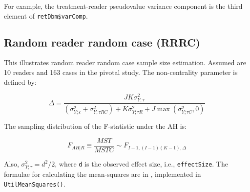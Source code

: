 \documentclass[
]{book}
\newenvironment{Shaded}{\begin{snugshade}}{\end{snugshade}}
\newcommand{\CommentTok}[1]{\textcolor[rgb]{0.56,0.35,0.01}{\textit{#1}}}
\newcommand{\NormalTok}[1]{#1}
\newcommand{\OperatorTok}[1]{\textcolor[rgb]{0.81,0.36,0.00}{\textbf{#1}}}
\begin{document}
\begin{Shaded}
\end{Shaded}

For example, the treatment-reader pseudovalue variance component is the third element of \texttt{retDbm\$varComp}.

\hypertarget{random-reader-random-case-rrrc}{%
\subsection{Random reader random case (RRRC)}\label{random-reader-random-case-rrrc}}

This illustrates random reader random case sample size estimation. Assumed are 10 readers and 163 cases in the pivotal study. The non-centrality parameter is defined by:

\begin{equation*} 
\Delta =\frac{JK\sigma _{Y;\tau }^{2}}{\left( \sigma _{Y;\varepsilon }^{2}+\sigma _{Y;\tau RC}^{2} \right)+K\sigma _{Y;\tau R}^{2}+J\max \left( \sigma _{Y;\tau C}^{2},0 \right)}
\end{equation*}

The sampling distribution of the F-statistic under the AH is:

\begin{equation*} 
{F_{\left. AH \right|R}}\equiv \frac{MST}{MSTC}\sim{F_{I-1,\left( I-1 \right)\left(K-1 \right),\Delta}}
\end{equation*}

Also, \(\sigma _{Y;\tau }^{2}={{d}^{2}}/2\), where \texttt{d} is the observed effect size, i.e., \texttt{effectSize}. The formulae for calculating the mean-squares are in \citep{RN1476}, implemented in \texttt{UtilMeanSquares()}.
\end{document}
